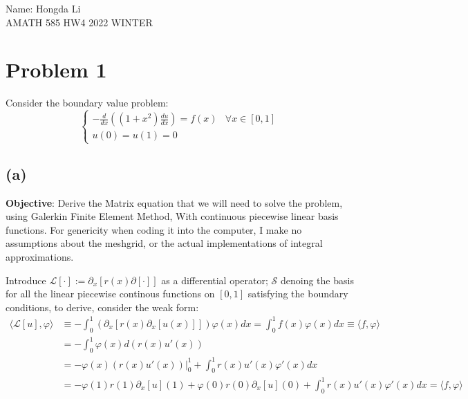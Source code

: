 \documentclass[]{article}
\begin{document}
\begin{center}
    Name: Hongda Li
    \\
    AMATH 585 HW4 2022 WINTER
\end{center}
\section*{Problem 1}
    Consider the boundary value problem: 
    $$
        \begin{cases}
            -\frac{d}{dx}\left(
                (1 + x^2)\frac{du}{dx}
            \right) = f(x) & \forall x \in [0, 1] 
            \\
            u(0) = u(1) = 0 & 
        \end{cases}
    $$
    \subsection*{(a)}
        \hspace{1.1em}
        \textbf{Objective}: Derive the Matrix equation that we will need to solve the problem, using Galerkin Finite Element Method, With continuous piecewise linear basis functions. For genericity when coding it into the computer, I make no assumptions about the meshgrid, or the actual implementations of integral approximations. 
        \par
        Introduce $\mathcal{L}[\cdot]:= \partial_x[r(x)\partial[\cdot]]$ as a differential operator; $\mathcal{S}$ denoing the basis for all the linear piecewise continous functions on $[0, 1]$ satisfying the boundary conditions, to derive, consider the weak form: 
        \begin{align*}\tag{1.a.1}\label{eqn:1.a.1}
            \langle \mathcal{L}[u], \varphi\rangle 
            &\equiv 
            -\int_{0}^1
            (\partial_x[r(x)\partial_x[u(x)]])\varphi(x)dx 
            = 
            \int_{0}^{1} f(x)\varphi(x)dx \equiv \langle f,\varphi\rangle
            \\
            &= 
            -\int_{0}^{1} 
                \varphi(x)
            d(r(x)u'(x))
            \\
            &= 
            -\left.\varphi(x)(r(x)u'(x))\right|_0^1
            +
            \int_{0}^{1} 
                r(x)u'(x)\varphi'(x)
            dx
            \\
            &= 
            -\varphi(1)r(1)\partial_x[u](1) + \varphi(0)r(0)\partial_x[u](0) + 
            \int_{0}^{1} 
                r(x)u'(x)\varphi'(x)
            dx
            = \langle f, \varphi\rangle
        \end{align*}
\end{document}
